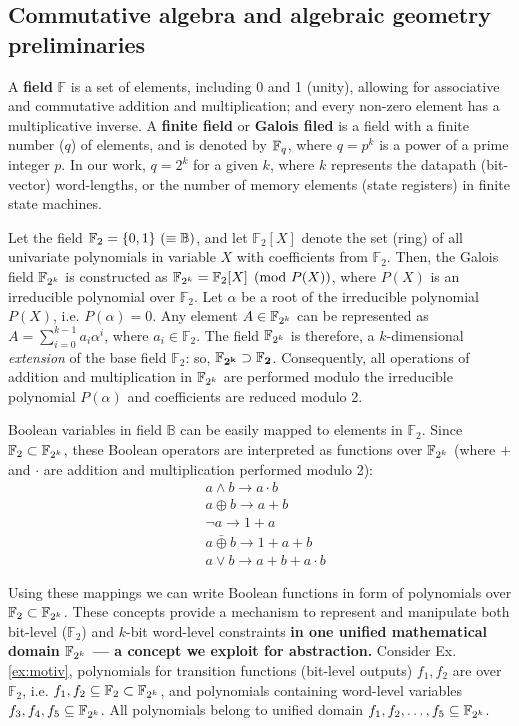 \subsection{Commutative algebra and algebraic geometry preliminaries}
A {\bf field} $\mathbb{F}$ is a set of elements, including 0 and 1 (unity),
allowing for associative and commutative addition and multiplication;
and every non-zero element has a multiplicative inverse.  A {\bf
  finite field} or {\bf Galois filed} is a field with a finite number
($q$) of elements, and is denoted by ${\mathbb{F}}_{q}$, where $q=p^k$ is a power of
a prime integer $p$. In our work, $q = 2^k$ for
a given $k$, where $k$ represents the datapath (bit-vector)
word-lengths, or the number of memory elements (state registers) in
finite state machines. 

Let the field $\mathbb{F}_2 = \{0, 1\} ~(\equiv {\mathbb{B}})$, and let
$\mathbb{F}_2[X]$ denote the set (ring) of all univariate polynomials
in variable $X$ with coefficients from $\mathbb{F}_2$. Then, the
Galois field ${\mathbb{F}}_{2^k}$ is constructed as ${\mathbb{F}}_{2^k} = \mathbb{F}_2[X] \pmod{
  P(X)}$, where $P(X)$ is an irreducible polynomial over
$\mathbb{F}_2$. Let $\alpha$ be a root of the irreducible polynomial
$P(X)$, i.e. $P(\alpha) = 0$. Any element $A \in {\mathbb{F}}_{2^k}$ can be
represented as $A = \sum_{i=0}^{k-1} a_i \alpha^i$, where $a_i \in
\mathbb{F}_2$. The field ${\mathbb{F}}_{2^k}$ is therefore, a $k$-dimensional {\it
  extension} of the base field $\mathbb{F}_2$: so,  $\mathbf{{\mathbb{F}}_{2^k} \supset
\mathbb{F}_2}$. Consequently, all operations of addition and
multiplication in ${\mathbb{F}}_{2^k}$ are performed modulo the irreducible
polynomial $P(\alpha)$ and coefficients are reduced modulo 2.  

Boolean variables in field $\mathbb B$ can be easily mapped to
elements in $\mathbb F_2$. Since $\mathbb F_2 \subset {\mathbb{F}}_{2^k}$, these 
Boolean operators are interpreted as functions over ${\mathbb{F}}_{2^k}$ (where $+$
and $\cdot$ are addition and multiplication performed modulo 2): 
\begin{align*}
&a\land b \to a\cdot b\\
&a\oplus b \to a+b\\
&\neg a \to 1+a\\
&a \bar{\oplus} b \to 1+a+b\\
&a \lor b \to a+b+a\cdot b
\end{align*}

Using these mappings we can write Boolean functions in form of
polynomials over $\mathbb F_2\subset {\mathbb{F}}_{2^k}$. 
These concepts provide a mechanism to represent and
manipulate both bit-level ($\mathbb{F}_2$) and $k$-bit word-level
constraints {\bf in one unified mathematical domain ${\mathbb{F}}_{2^k}$ --- a
  concept we   exploit for abstraction. }
  Consider Ex.\ref{ex:motiv},
polynomials for transition functions (bit-level outputs) $f_1,f_2$
are over $\mathbb F_2$, i.e. $f_1,f_2\subseteq \mathbb F_2 \subset {\mathbb{F}}_{2^k}$,
and polynomials containing word-level variables $f_3,f_4,f_5 \subseteq {\mathbb{F}}_{2^k}$.
All polynomials belong to unified domain $f_1,f_2,\dots,f_5 \subseteq {\mathbb{F}}_{2^k}$.

